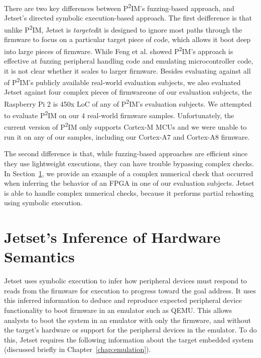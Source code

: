 There are two key differences between P\textsuperscript{2}IM's fuzzing-based approach, and Jetset's directed symbolic execution-based approach.
The first deifference is that unlike P\textsuperscript{2}IM, Jetset is \textit{targeted}\textemdash it is designed to ignore most paths through the firmware to focus on a particular target piece of code, which allows it boot deep into large pieces of firmware.
While Feng et al. showed P\textsuperscript{2}IM's approach is effective at fuzzing peripheral handling code and emulating microcontroller code, it is not clear whether it scales to larger firmware.
Besides evaluating against all of P\textsuperscript{2}IM's publicly available real-world evaluation subjects, we also evaluated Jetset against four complex pieces of firmware\textemdash one of our evaluation subjects, the Raspberry Pi 2 is 450x LoC of any of P\textsuperscript{2}IM's evaluation subjects.
We attempted to evaluate P\textsuperscript{2}IM on our 4 real-world firmware samples. Unfortunately, the current version of P\textsuperscript{2}IM only supports Cortex-M MCUs and we were unable to run it on any of our samples, including our Cortex-A7 and Cortex-A8 firmware.

The second difference is that, while fuzzing-based approaches are efficient since they use lightweight executions, they can have trouble bypassing complex checks. 
In Section~\ref{sec:jetset-eval}, we provide an example of a complex numerical check that occurred when inferring the behavior of an FPGA in one of our evaluation subjects.
Jetset is able to handle complex numerical checks, because it performs partial rehosting using symbolic execution.

\section{Jetset's Inference of Hardware Semantics}
\label{sec:jetset-eval}

Jetset uses symbolic execution to infer how peripheral devices must respond to reads from the firmware for execution to progress toward the goal address.
It uses this inferred information to deduce and reproduce expected peripheral device functionality to boot firmware in an emulator such as QEMU.
This allows analysts to boot the system in an emulator with only the firmware, and without the target's hardware or support for the peripheral devices in the emulator.
To do this, Jetset requires the following information about the target embedded system (discussed briefly in Chapter~\ref{chap:emulation}).

